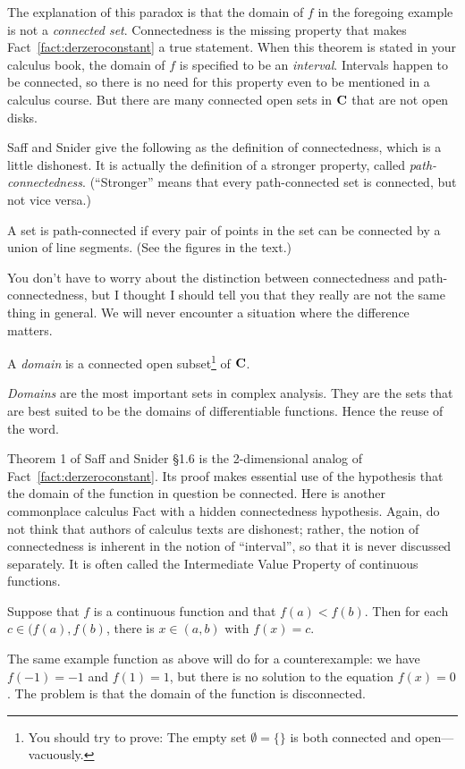 \documentclass[twocolumn,12pt]{article}
\begin{document}
The explanation of this paradox is that the domain of $f$ in the foregoing example is not a \emph{connected set}. Connectedness is the missing property that makes Fact~\ref{fact:derzeroconstant} a true statement. When this theorem is stated in your calculus book, the domain of $f$ is specified to be an \emph{interval}. Intervals happen to be connected, so there is no need for this property even to be mentioned in a calculus course. But there are many connected open sets in $\mathbf{C}$ that are not open disks.

Saff and Snider give the following as the definition of connectedness, which is a little dishonest. It is actually the definition of a stronger property, called \emph{path-connectedness}. (``Stronger'' means that every path-connected set is connected, but not vice versa.) 
\begin{definition} \label{def:pathconnected}
    A set is path-connected if every pair of points in the set can be connected by a union of line segments. (See the figures in the text.)
\end{definition} 
You don't have to worry about the distinction between connectedness and path-connectedness, but I thought I should tell you that they really are not the same thing in general. We will never encounter a situation where the difference matters.
\begin{definition} \label{def:domain}
    A \emph{domain} is a connected open subset\footnote{You should try to prove: The empty set $\emptyset = \{\}$ is both connected and open---vacuously.} of $\mathbf{C}$.
\end{definition}
\emph{Domains} are the most important sets in complex analysis. They are the sets that are best suited to be the domains of differentiable functions. Hence the reuse of the word.

Theorem 1 of Saff and Snider \S1.6 is the 2-dimensional analog of Fact~\ref{fact:derzeroconstant}. Its proof makes essential use of the hypothesis that the domain of the function in question be connected. Here is another commonplace calculus Fact with a hidden connectedness hypothesis. Again, do not think that authors of calculus texts are dishonest; rather, the notion of connectedness is inherent in the notion of ``interval'', so that it is never discussed separately. It is often called the Intermediate Value Property of continuous functions.
\begin{fact} \label{fact:ivp}
    Suppose that $f$ is a continuous function and that $f(a) < f(b)$. Then for each $c \in (f(a), f(b)$, there is $x \in (a,b)$ with $f(x) = c$.
\end{fact}
The same example function as above will do for a counterexample: we have $f(-1) = -1$ and $f(1) = 1$, but there is no solution to the equation $f(x) = 0$. The problem is that the domain of the function is disconnected.
\end{document}
